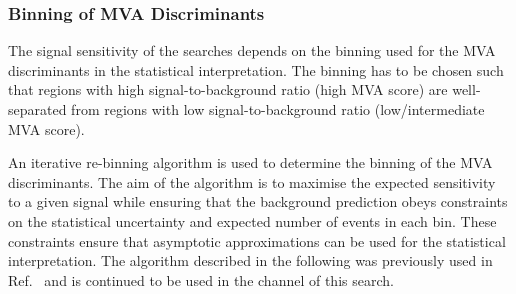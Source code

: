 \subsubsection{Binning of MVA Discriminants}%
\label{sec:binning_alg}

The signal sensitivity of the \HH searches depends on the binning used for the
MVA discriminants in the statistical interpretation. The binning has to be
chosen such that regions with high signal-to-background ratio (high MVA score)
are well-separated from regions with low signal-to-background ratio
(low/intermediate MVA score).

An iterative re-binning algorithm is used to determine the binning of the MVA
discriminants. The aim of the algorithm is to maximise the expected sensitivity
to a given signal while ensuring that the background prediction obeys
constraints on the statistical uncertainty and expected number of events in each
bin. These constraints ensure that asymptotic approximations can be used for the
statistical interpretation. The algorithm described in the following was
previously used in Ref.~\cite{HIGG-2016-16-witherratum} and is continued to be
used in the \hadhad channel of this search.

